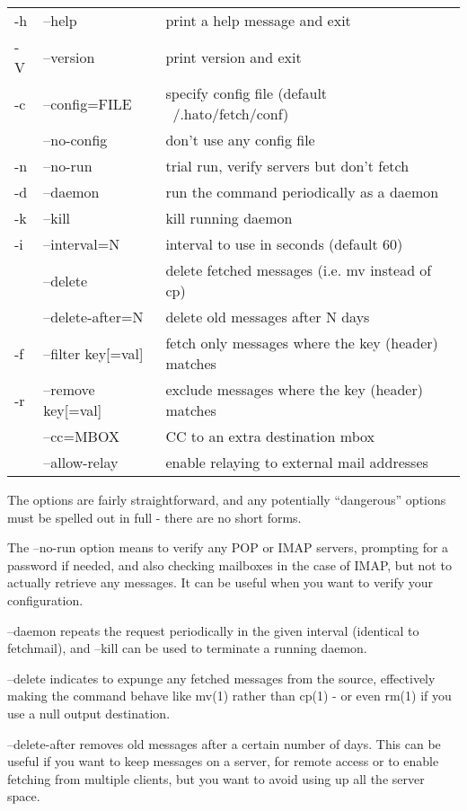 \begin{tabular}{l l l}
  -h & --help             & print a help message and exit \\
  -V & --version          & print version and exit \\
  -c & --config=FILE      & specify config file (default ~/.hato/fetch/conf) \\
     & --no-config        & don't use any config file \\
  -n & --no-run           & trial run, verify servers but don't fetch \\
  -d & --daemon           & run the command periodically as a daemon \\
  -k & --kill             & kill running daemon \\
  -i & --interval=N       & interval to use in seconds (default 60) \\
     & --delete           & delete fetched messages (i.e. mv instead of cp) \\
     & --delete-after=N   & delete old messages after N days \\
  -f & --filter key[=val] & fetch only messages where the key (header) matches \\
  -r & --remove key[=val] & exclude messages where the key (header) matches \\
     & --cc=MBOX          & CC to an extra destination mbox \\
     & --allow-relay      & enable relaying to external mail addresses \\
\end{tabular}

The options are fairly straightforward, and any potentially
``dangerous'' options must be spelled out in full - there are no short
forms.

The --no-run option means to verify any POP or IMAP servers, prompting
for a password if needed, and also checking mailboxes in the case of
IMAP, but not to actually retrieve any messages.  It can be useful
when you want to verify your configuration.

--daemon repeats the request periodically in the given interval
(identical to fetchmail), and --kill can be used to terminate a
running daemon.

--delete indicates to expunge any fetched messages from the source,
effectively making the command behave like mv(1) rather than cp(1) -
or even rm(1) if you use a null output destination.

--delete-after removes old messages after a certain number of days.
This can be useful if you want to keep messages on a server, for
remote access or to enable fetching from multiple clients, but you
want to avoid using up all the server space.


